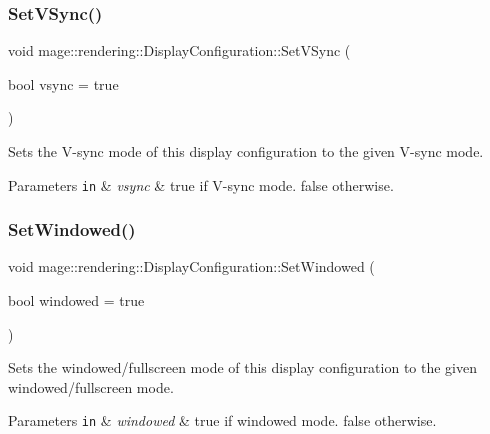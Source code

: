 \subsubsection{\texorpdfstring{Set\+V\+Sync()}{SetVSync()}}
{\footnotesize\ttfamily void mage\+::rendering\+::\+Display\+Configuration\+::\+Set\+V\+Sync (\begin{DoxyParamCaption}\item[{bool}]{vsync = {\ttfamily true} }\end{DoxyParamCaption})\hspace{0.3cm}{\ttfamily [noexcept]}}

Sets the V-\/sync mode of this display configuration to the given V-\/sync mode.


\begin{DoxyParams}[1]{Parameters}
\mbox{\tt in}  & {\em vsync} & {\ttfamily true} if V-\/sync mode. {\ttfamily false} otherwise. \\
\hline
\end{DoxyParams}
\mbox{\label{classmage_1_1rendering_1_1_display_configuration_a78d0902979bd5a0eff7fef0aa7976a7f}} 
\subsubsection{\texorpdfstring{Set\+Windowed()}{SetWindowed()}}
{\footnotesize\ttfamily void mage\+::rendering\+::\+Display\+Configuration\+::\+Set\+Windowed (\begin{DoxyParamCaption}\item[{bool}]{windowed = {\ttfamily true} }\end{DoxyParamCaption})\hspace{0.3cm}{\ttfamily [noexcept]}}

Sets the windowed/fullscreen mode of this display configuration to the given windowed/fullscreen mode.


\begin{DoxyParams}[1]{Parameters}
\mbox{\tt in}  & {\em windowed} & {\ttfamily true} if windowed mode. {\ttfamily false} otherwise. \\
\hline
\end{DoxyParams}
\mbox{\label{classmage_1_1rendering_1_1_display_configuration_abbcb68e66c4a659cb169819a4f1d0d5d}} 
